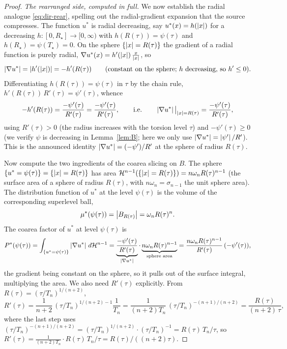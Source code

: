 \begin{proof}
\emph{The rearranged side, computed in full.} We now establish the radial
analogue \eqref{eq:dir-rear}, spelling out the radial-gradient expansion
that the source compresses. The function $u^*$ is radial decreasing, say
$u^*(x)=h(\left|x\right|)$ for a decreasing $h:[0,R_\star]\to[0,\infty)$ with
$h(R(\tau))=\psi(\tau)$ and $h(R_\star)=\psi(T_\star)=0$. On the sphere
$\{\left|x\right|=R(\tau)\}$ the gradient of a radial function is purely radial,
$\nabla u^*(x)=h'(\left|x\right|)\,\tfrac{x}{\left|x\right|}$, so
\begin{equation}\label{eq:radgrad}
  \left|\nabla u^*\right|=\left|h'(\left|x\right|)\right|=-h'(R(\tau))\qquad
  \text{(constant on the sphere; $h$ decreasing, so $h'\le0$).}
\end{equation}
Differentiating $h(R(\tau))=\psi(\tau)$ in $\tau$ by the chain rule,
$h'(R(\tau))\,R'(\tau)=\psi'(\tau)$, whence
\begin{equation}\label{eq:hprime}
  -h'(R(\tau))=\frac{-\psi'(\tau)}{R'(\tau)}
  =\frac{-\psi'(\tau)}{R'(\tau)},
  \qquad\text{i.e.}\qquad
  \left|\nabla u^*\right|\big|_{\left|x\right|=R(\tau)}=\frac{-\psi'(\tau)}{R'(\tau)} ,
\end{equation}
using $R'(\tau)>0$ (the radius increases with the torsion level $\tau$) and
$-\psi'(\tau)\ge0$ (we verify $\psi$ is decreasing in Lemma~\ref{lem:B}; here
we only use $\left|\nabla u^*\right|=\left|\psi'\right|/R'$). This is the announced
identity $\left|\nabla u^*\right|=(-\psi')/R'$ at the sphere of radius $R(\tau)$.

Now compute the two ingredients of the coarea slicing on $B$. The sphere
$\{u^*=\psi(\tau)\}=\{\left|x\right|=R(\tau)\}$ has area
$\mathcal H^{n-1}(\{\left|x\right|=R(\tau)\})=n\omega_n R(\tau)^{n-1}$ (the surface
area of a sphere of radius $R(\tau)$, with $n\omega_n=\sigma_{n-1}$ the unit
sphere area). The distribution function of $u^*$ at the level $\psi(\tau)$ is
the volume of the corresponding superlevel ball,
\begin{equation}\label{eq:mustar}
  \mu^*(\psi(\tau))=\left|B_{R(\tau)}\right|=\omega_n R(\tau)^n .
\end{equation}
The coarea factor of $u^*$ at level $\psi(\tau)$ is
\begin{equation}\label{eq:Pstar}
  P^*(\psi(\tau))
  =\int_{\{u^*=\psi(\tau)\}}\left|\nabla u^*\right|\,d\mathcal H^{n-1}
  =\underbrace{\frac{-\psi'(\tau)}{R'(\tau)}}_{\left|\nabla u^*\right|}
   \cdot\underbrace{n\omega_n R(\tau)^{n-1}}_{\text{sphere area}}
  =\frac{n\omega_n R(\tau)^{n-1}}{R'(\tau)}\,(-\psi'(\tau)),
\end{equation}
the gradient being constant on the sphere, so it pulls out of the surface
integral, multiplying the area. We also need $R'(\tau)$ explicitly. From
$R(\tau)=(\tau/T_n)^{1/(n+2)}$,
\begin{equation}\label{eq:Rprime}
  R'(\tau)=\frac{1}{n+2}\,(\tau/T_n)^{1/(n+2)-1}\frac1{T_n}
  =\frac{1}{(n+2)T_n}\,(\tau/T_n)^{-(n+1)/(n+2)}
  =\frac{R(\tau)}{(n+2)\,\tau},
\end{equation}
where the last step uses $(\tau/T_n)^{-(n+1)/(n+2)}
=(\tau/T_n)^{1/(n+2)}\cdot(\tau/T_n)^{-1}=R(\tau)\,T_n/\tau$, so
$R'(\tau)=\tfrac{1}{(n+2)T_n}\cdot R(\tau)\,T_n/\tau=R(\tau)/((n+2)\tau)$.


\end{proof}
